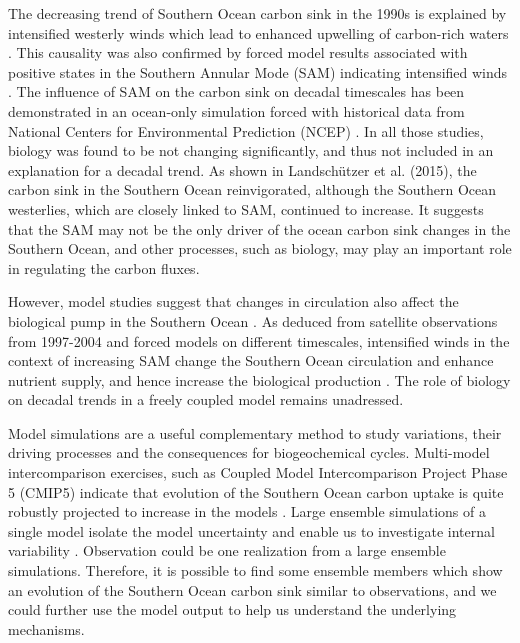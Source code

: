 \documentclass[12pt]{article}
\begin{document}
The decreasing trend of Southern Ocean carbon sink in the 1990s is explained by intensified westerly winds which lead to enhanced upwelling of carbon-rich waters \citep{LeQuere2007}. This causality was also confirmed by forced model results associated with positive states in the Southern Annular Mode (SAM) indicating intensified winds \citep{Lovenduski2007}. The influence of SAM on the carbon sink on decadal timescales has been demonstrated in an ocean-only simulation forced with historical data from National Centers for Environmental Prediction (NCEP) \citep{Lovenduski2008}. In all those studies, biology was found to be not changing significantly, and thus not included in an explanation for a decadal trend. As shown in Landsch{\"u}tzer et al. (2015), the carbon sink in the Southern Ocean reinvigorated, although the Southern Ocean westerlies, which are closely linked to SAM, continued to increase. It suggests that the SAM may not be the only driver of the ocean carbon sink changes in the Southern Ocean, and other processes, such as biology, may play an important role in regulating the carbon fluxes.   


However, model studies suggest that changes in circulation also affect the biological pump in the Southern Ocean \citep{Sarmiento1998}. As deduced from satellite observations from 1997-2004 and forced models on different timescales, intensified winds in the context of increasing SAM change the Southern Ocean circulation and enhance nutrient supply, and hence increase the biological production \citep{Lovenduski2005,Hauck2013,wang2012}. The role of biology on decadal trends in a freely coupled model remains unadressed.

Model simulations are a useful complementary method to study variations, their driving processes and the consequences for biogeochemical cycles. Multi-model intercomparison exercises, such as Coupled Model Intercomparison Project Phase 5 (CMIP5) indicate that evolution of the Southern Ocean carbon uptake is quite robustly projected to increase in the models \citep{Wang2016}. 
Large ensemble simulations of a single model isolate the model uncertainty and enable us to investigate internal variability \citep{McKinley2016}. Observation could be one realization from a large ensemble simulations. Therefore, it is possible to find some ensemble members which show an evolution of the Southern Ocean carbon sink similar to observations, and we could further use the model output to help us understand the underlying mechanisms.
\end{document}
